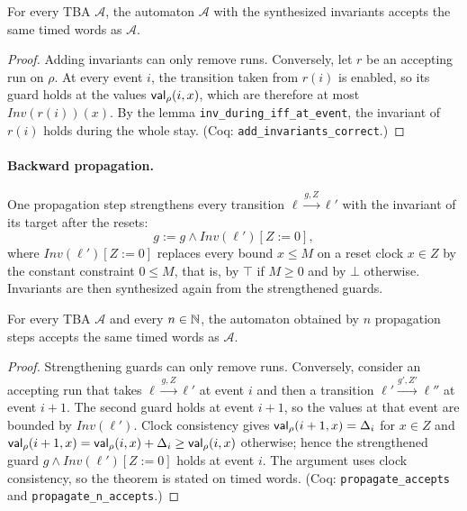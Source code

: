 \begin{theorem}
\label{thm:inv-synthesis}
For every TBA $\mathcal A$, the automaton $\mathcal A$ with the synthesized
invariants accepts the same timed words as $\mathcal A$.
\end{theorem}

\begin{proof}
Adding invariants can only remove runs.  Conversely, let $r$ be an accepting
run on $\rho$.  At every event $i$, the transition taken from $r(i)$ is enabled,
so its guard holds at the values $\mathsf{val}_\rho(i,x)$, which are therefore at most
$\mathit{Inv}(r(i))(x)$.  By the lemma \texttt{inv\_\allowbreak{}during\_\allowbreak{}iff\_\allowbreak{}at\_\allowbreak{}event}, the invariant of $r(i)$ holds during
the whole stay.  (Coq: \texttt{add\_\allowbreak{}invariants\_\allowbreak{}correct}.)
\end{proof}

\paragraph{Backward propagation.}
One propagation step strengthens every transition
$\ell\xrightarrow{g,Z}\ell'$ with the invariant of its target after the
resets:
\[
  g := g\wedge\mathit{Inv}(\ell')[Z:=0],
\]
where $\mathit{Inv}(\ell')[Z:=0]$ replaces every bound $x\le M$ on a reset clock
$x\in Z$ by the constant constraint $0\le M$, that is, by $\top$ if $M\ge0$ and
by $\bot$ otherwise.  Invariants are then synthesized again from the
strengthened guards.

\begin{theorem}
\label{thm:propagation}
For every TBA $\mathcal A$ and every $n\in\mathbb{N}$, the automaton obtained by
$n$ propagation steps accepts the same timed words as $\mathcal A$.
\end{theorem}

\begin{proof}
Strengthening guards can only remove runs.  Conversely, consider an accepting
run that takes $\ell\xrightarrow{g,Z}\ell'$ at event $i$ and then a transition
$\ell'\xrightarrow{g',Z'}\ell''$ at event $i+1$.  The second guard holds at event
$i+1$, so the values at that event are bounded by $\mathit{Inv}(\ell')$.  Clock
consistency gives $\mathsf{val}_\rho(i+1,x)=\Delta_i$ for $x\in Z$ and
$\mathsf{val}_\rho(i+1,x)=\mathsf{val}_\rho(i,x)+\Delta_i\ge\mathsf{val}_\rho(i,x)$ otherwise; hence
the strengthened guard $g\wedge\mathit{Inv}(\ell')[Z:=0]$ holds at event $i$.
The argument uses clock consistency, so the theorem is stated on timed words.
(Coq: \texttt{propagate\_\allowbreak{}accepts} and
\texttt{propagate\_\allowbreak{}n\_\allowbreak{}accepts}.)
\end{proof}

